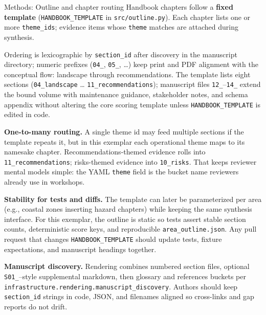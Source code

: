 \documentclass[
  ignorenonframetext,
]{beamer}
\author{\texorpdfstring{}{}}
\date{}
\begin{document}
\begin{frame}[fragile]{Methods: Outline and chapter routing}
\protect{}\label{methods-outline-and-chapter-routing}
Handbook chapters follow a \textbf{fixed template}
(\texttt{HANDBOOK\_TEMPLATE} in \texttt{src/outline.py}). Each chapter
lists one or more \texttt{theme\_ids}; evidence items whose
\texttt{theme} matches are attached during synthesis.

Ordering is lexicographic by \texttt{section\_id} after discovery in the
manuscript directory; numeric prefixes (\texttt{04\_}, \texttt{05\_},
\ldots) keep print and PDF alignment with the conceptual flow: landscape
through recommendations. The template lists eight sections
(\texttt{04\_landscape} \ldots{} \texttt{11\_recommendations});
manuscript files \texttt{12\_}--\texttt{14\_} extend the bound volume
with maintenance guidance, stakeholder notes, and schema appendix
without altering the core scoring template unless
\texttt{HANDBOOK\_TEMPLATE} is edited in code.

\textbf{One-to-many routing.} A single theme id may feed multiple
sections if the template repeats it, but in this exemplar each
operational theme maps to its namesake chapter. Recommendations-themed
evidence rolls into \texttt{11\_recommendations}; risks-themed evidence
into \texttt{10\_risks}. That keeps reviewer mental models simple: the
YAML \texttt{theme} field is the bucket name reviewers already use in
workshops.

\textbf{Stability for tests and diffs.} The template can later be
parameterized per area (e.g., coastal zones inserting hazard chapters)
while keeping the same synthesis interface. For this exemplar, the
outline is static so tests assert stable section counts, deterministic
score keys, and reproducible \texttt{area\_outline.json}. Any pull
request that changes \texttt{HANDBOOK\_TEMPLATE} should update tests,
fixture expectations, and manuscript headings together.

\textbf{Manuscript discovery.} Rendering combines numbered section
files, optional \texttt{S01\_}--style supplemental markdown, then
glossary and references buckets per
\texttt{infrastructure.rendering.manuscript\_discovery}. Authors should
keep \texttt{section\_id} strings in code, JSON, and filenames aligned
so cross-links and gap reports do not drift.
\end{frame}
\end{document}
